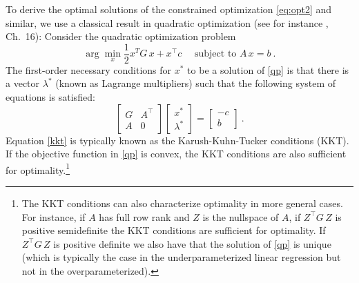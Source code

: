 \documentclass[12pt,letterpaper]{article}
\begin{document}
To derive the optimal solutions of the constrained optimization \eqref{eq:opt2} and similar, we use a classical result in quadratic optimization (see for instance \citealt{nocedal2006numerical}, Ch.~16):
Consider the quadratic optimization problem 
\begin{equation} \label{qp}
    \arg\min_x \frac{1}{2} x^T G\, x + x^\top c \quad \text{ subject to } A\,x=b
    ~.
\end{equation}
The first-order necessary conditions for $x^*$ to be a solution of \eqref{qp} is that there is a vector $\lambda^*$ (known as Lagrange multipliers) such that the following system of equations is satisfied:
\begin{equation}
    \left[
    \begin{matrix}
    G & A^\top \\ 
    A & 0
    \end{matrix}\right]
    \left[
    \begin{matrix}
    x^* \\ 
    \lambda^*
    \end{matrix}\right] = 
    \left[
    \begin{matrix}
    -c \\ 
    b
    \end{matrix}\right]
    ~.
    \label{kkt}
\end{equation}
Equation \eqref{kkt} is typically known as the Karush-Kuhn-Tucker conditions (KKT). If the objective function in \eqref{qp} is convex, the KKT conditions are also sufficient for optimality.\footnote{The KKT conditions can also characterize optimality in more general cases. For instance, if $A$ has full row rank and $Z$ is the nullspace of $A$, if $Z^\top G\, Z$ is positive semidefinite the KKT conditions are sufficient for optimality. If $Z^\top G\, Z$ is positive definite we also have that the solution of \eqref{qp} is unique (which is typically the case in the underparameterized linear regression but not in the overparameterized).}
\end{document}
